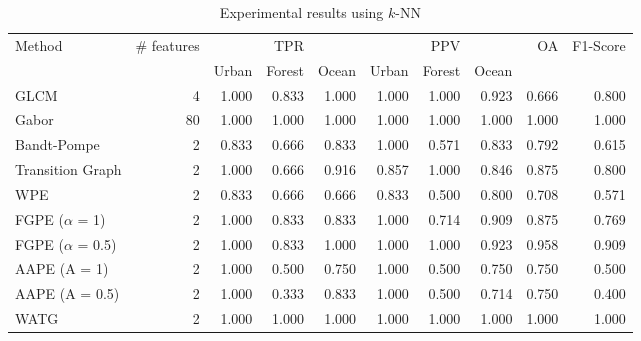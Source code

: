 \documentclass[journal]{IEEEtran}
\begin{document}
	\begin{table}[hbt]
		\centering
		\caption{Experimental results using $k$-NN}
		\label{tab:result1}
		\begin{tabular}{l*9{r}}
			\toprule
			\multirow{2}{*}{Method}      & \multirow{2}{*}{\# features}         &       & TPR   &       &       & PPV    &       & \multirow{2}{*}{OA}  & \multirow{2}{*}{F1-Score} \\ \cmidrule(lr){3-5} \cmidrule(lr){6-8}
			&   & Urban & Forest & Ocean & Urban & Forest & Ocean & &  \\ \cmidrule(lr){1-1}
			\cmidrule(lr){2-2}
			\cmidrule(lr){3-5}
			\cmidrule(lr){6-8}
			\cmidrule(lr){9-9}
			\cmidrule(lr){10-10}
			GLCM            & 4   & 1.000 & 0.833  & 1.000 & 1.000 & 1.000  & 0.923 & 0.666 & 0.800\\
			Gabor           & 80  & 1.000 & 1.000  & 1.000 & 1.000 & 1.000  & 1.000 & 1.000 & 1.000\\ %
			\cmidrule(lr){1-1}
			\cmidrule(lr){2-2}
			\cmidrule(lr){3-5}
			\cmidrule(lr){6-8}
			\cmidrule(lr){9-9}
			\cmidrule(lr){10-10}
			Bandt-Pompe   & 2 & 0.833 &  0.666  & 0.833 & 1.000 & 0.571  & 0.833 & 0.792 &  0.615  \\ 
			Transition Graph & 2  & 1.000 & 0.666  & 0.916 & 0.857 & 1.000  & 0.846 & 0.875 & 0.800 \\ %
			\cmidrule(lr){1-1}
			\cmidrule(lr){2-2}
			\cmidrule(lr){3-5}
			\cmidrule(lr){6-8}
			\cmidrule(lr){9-9}
			\cmidrule(lr){10-10}
			WPE   & 2 & 0.833 &  0.666  & 0.666 & 0.833 & 0.500  & 0.800 & 0.708 &  0.571  \\ 
			FGPE ($\alpha$ = 1)  & 2 & 1.000 &  0.833  & 0.833 & 1.000 & 0.714  & 0.909 & 0.875 &  0.769  \\ 
			FGPE ($\alpha$ = 0.5)   & 2 & 1.000 &  0.833  & 1.000 & 1.000 & 1.000  & 0.923 & 0.958 &  0.909  \\ 
			AAPE (A = 1)   & 2 & 1.000 &  0.500  & 0.750  & 1.000 & 0.500  & 0.750  & 0.750 &  0.500  \\ 
			AAPE (A = 0.5)   & 2 & 1.000 &  0.333  & 0.833 & 1.000 & 0.500  & 0.714 & 0.750 &  0.400  \\ %
			\cmidrule(lr){1-1}
			\cmidrule(lr){2-2}
			\cmidrule(lr){3-5}
			\cmidrule(lr){6-8}
			\cmidrule(lr){9-9}
			\cmidrule(lr){10-10}
			WATG        & 2  & 1.000 & 1.000  & 1.000 & 1.000 & 1.000  & 1.000 & 1.000 & 1.000 \\ 
			\bottomrule
		\end{tabular}
	\end{table}
	
\end{document}
